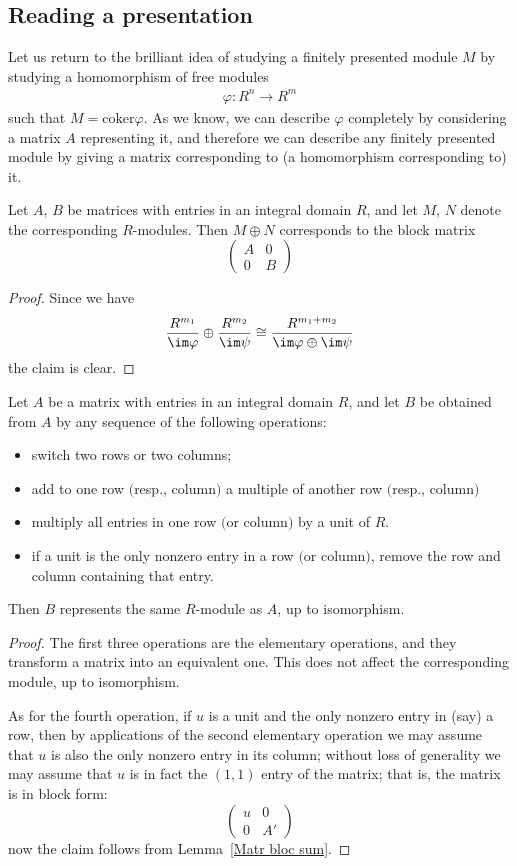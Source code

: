 \subsection{Reading a presentation}
Let us return to the brilliant idea of studying a finitely presented module $M$ by studying a homomorphism of free modules
\begin{align*}
\varphi: R^n\to R^m
\end{align*}
such that $M=\mathrm{coker}\varphi$. As we know, we can describe $\varphi$ completely by considering
a matrix $A$ representing it, and therefore we can describe any finitely presented module by giving a matrix corresponding to (a homomorphism corresponding to) it.\par
\begin{lemma}\label{Matr bloc sum}
Let $A$, $B$ be matrices with entries in an integral domain $R$, and let $M$, $N$ denote the corresponding $R$-modules. Then $M\oplus N$ corresponds to the block matrix
\[\left(\begin{array}{c|c}
A&0\\
\hline
0&B
\end{array}\right)\]
\end{lemma}
\begin{proof}
Since we have
\[\dfrac{R^{m_1}}{\im\varphi}\oplus\dfrac{R^{m_2}}{\im\psi}\cong \dfrac{R^{m_1+m_2}}{\im\varphi\oplus\im\psi}\]
the claim is clear.
\end{proof}
\begin{proposition}\label{Read pres}
Let $A$ be a matrix with entries in an integral domain $R$, and let $B$ be obtained from $A$ by any sequence of the following operations:
\begin{itemize}
\item switch two rows or two columns;
\item add to one row $($resp., column$)$ a multiple of another row $($resp., column$)$
\item multiply all entries in one row $($or column$)$ by a unit of $R$.
\item if a unit is the only nonzero entry in a row $($or column$)$, remove the row and column containing that entry.
\end{itemize}
Then $B$ represents the same $R$-module as $A$, up to isomorphism.
\end{proposition}
\begin{proof}
The first three operations are the elementary operations, and they transform a matrix into an equivalent one. This does not affect the corresponding module, up to isomorphism.\par
As for the fourth operation, if $u$ is a unit and the only nonzero entry in (say) a row, then by applications of the second elementary operation we may assume that $u$ is also the only nonzero entry in its column; without loss of generality we may assume that $u$ is in fact the $(1,1)$ entry of the matrix; that is, the matrix is in block form:
\[\left(\begin{array}{c|c}
u&0\\
\hline
0&A'
\end{array}\right)\]
now the claim follows from Lemma~\ref{Matr bloc sum}.
\end{proof}
